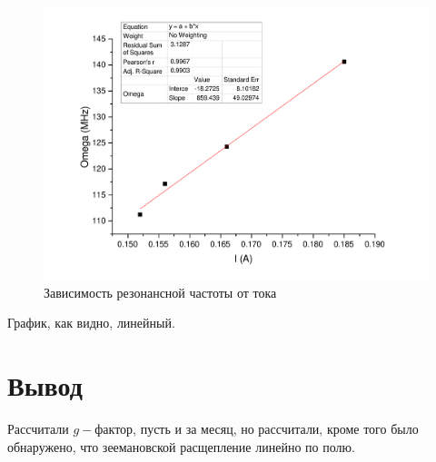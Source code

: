 \documentclass[a4paper,12pt]{article}
\theoremstyle{plain} %
\theoremstyle{definition} %
\theoremstyle{remark} %
\begin{document}
    \begin{figure}[H]
        \centering
        \includegraphics[width = 0.6\linewidth]{lin.pdf}
        \caption{Зависимость резонансной частоты от тока}
    \end{figure}
    
    График, как видно, линейный.
   \section{Вывод}
    Рассчитали $g-$фактор, пусть и за месяц, но рассчитали, кроме того было обнаружено, что зеемановской расщепление линейно по полю.
    
\end{document}
